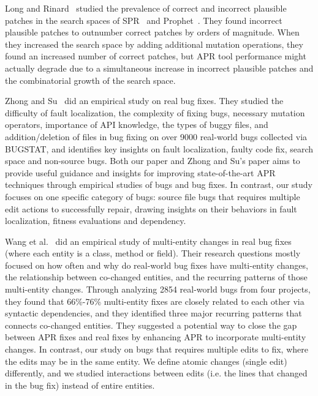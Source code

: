 \documentclass[sigconf, timestamp-false, anonymous=true]{acmart}
\begin{document}
Long and Rinard~\cite{long-search-spaces} studied the prevalence of 
correct and incorrect plausible patches in the search spaces of SPR~\cite{spr} 
and Prophet~\cite{prophet}. They found incorrect plausible patches to outnumber 
correct patches by orders of magnitude. When they increased the search space 
by adding additional mutation operations, they found an increased number of 
correct patches, but APR tool performance might actually degrade due to a 
simultaneous increase in incorrect plausible patches and the combinatorial 
growth of the search space.

Zhong and Su~\cite{zhong2015} did an empirical study on real bug fixes. 
They studied the difficulty of fault localization, the complexity of fixing bugs, 
necessary mutation operators, importance of API knowledge, the types of buggy files, 
and addition/deletion of files in bug fixing on over 9000 real-world bugs collected via BUGSTAT, 
and identifies key insights on fault localization, faulty code fix, search space and non-source bugs. 
Both our paper and Zhong and Su's paper aims to provide useful guidance and insights for 
improving state-of-the-art APR techniques through empirical studies of bugs and bug fixes. 
In contrast, our study focuses on one specific category of bugs: 
source file bugs that requires multiple edit actions to successfully repair, 
drawing insights on their behaviors in fault localization, fitness evaluations and dependency.

Wang et al.~\cite{wang2018} did an empirical study of multi-entity changes in real bug fixes 
(where each entity is a class, method or field). Their research questions mostly focused on 
how often and why do real-world bug fixes have multi-entity changes, the relationship 
between co-changed entities, and the recurring patterns of those multi-entity changes. 
Through analyzing 2854 real-world bugs from four projects, they found that 66\%-76\% 
multi-entity fixes are closely related to each other via syntactic dependencies, 
and they identified three major recurring patterns that connects co-changed entities. 
They suggested a potential way to close the gap between APR fixes and real fixes by 
enhancing APR to incorporate multi-entity changes. In contrast, our study on bugs that
requires multiple edits to fix, where the edits may be in the same entity. We define atomic 
changes (single edit) differently, and we studied interactions between edits 
(i.e. the lines that changed in the bug fix) instead of entire entities.
\end{document}
